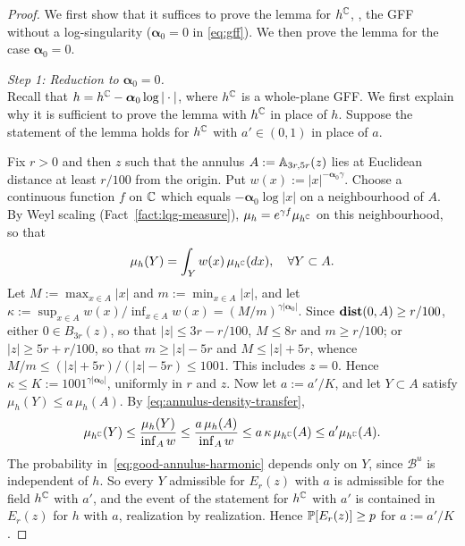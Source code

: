 \documentclass[12pt]{amsart}
\numberwithin{equation}{section}
\begin{document}
	\begin{proof}
		
		
		We first show that it suffices to prove the lemma for $h^{\C}$, \ie, the GFF without a log-singularity ($\boldsymbol{\alpha}_0 = 0$ in \eqref{eq:gff}).
		We then prove the lemma for the case $\boldsymbol{\alpha}_0 = 0$.
		
		{\it Step 1: Reduction to $\boldsymbol{\alpha}_0 = 0$.} \\
		Recall that $h = h^\C -\boldsymbol{\alpha}_0 \log |\cdot|$, where $h^\C$ is a whole-plane GFF. 
		We first explain why it is sufficient to prove the lemma with $h^\C$ in place of $h$. 
		Suppose the statement of the lemma holds for $h^{\C}$ with $a' \in (0,1)$ in place of $a$. 
		
		Fix $r > 0$ and then $z$ such that the annulus $A := \A_{3 r, 5 r}(z)$ lies at Euclidean distance at least $r/100$ from the origin. Put $w(x) := |x|^{-\boldsymbol{\alpha}_0 \gamma}$.
		Choose a continuous function $f$ on $\C$ which equals $-\boldsymbol{\alpha}_0 \log|x|$ on a neighbourhood of $A$. By Weyl scaling (Fact~\ref{fact:lqg-measure}), $\mu_h = e^{\gamma f} \mu_{h^{\C}}$ on this neighbourhood, so that
		\begin{equation} \label{eq:annulus-density-transfer}
		\mu_h(Y) = \int_Y w(x) \, \mu_{h^{\C}}(dx), \quad \forall Y \subset A .
		\end{equation}
		Let $M := \max_{x \in A} |x|$ and $m := \min_{x \in A} |x|$, and let $\kappa := \sup_{x \in A} w(x) / \inf_{x \in A} w(x) = (M/m)^{\gamma|\boldsymbol{\alpha}_0|}$. Since $\dist(0,A) \geq r/100$, either $0 \in B_{3r}(z)$, so that $|z| \leq 3r - r/100$, $M \leq 8r$ and $m \geq r/100$; or $|z| \geq 5r + r/100$, so that $m \geq |z| - 5r$ and $M \leq |z| + 5r$, whence $M/m \leq (|z|+5r)/(|z|-5r) \leq 1001$. This includes $z = 0$. Hence $\kappa \leq K := 1001^{\gamma|\boldsymbol{\alpha}_0|}$, uniformly in $r$ and $z$.
		Now let $a := a'/K$, and let $Y \subset A$ satisfy $\mu_h(Y) \leq a\, \mu_h(A)$. By \eqref{eq:annulus-density-transfer},
		\[
		\mu_{h^{\C}}(Y) \leq \frac{\mu_h(Y)}{\inf_A w} \leq \frac{a\, \mu_h(A)}{\inf_A w} \leq a\, \kappa\, \mu_{h^{\C}}(A) \leq a' \mu_{h^{\C}}(A).
		\]
		The probability in~\eqref{eq:good-annulus-harmonic} depends only on $Y$, since $\mathcal B^u$ is independent of $h$. So every $Y$ admissible for $E_r(z)$ with $a$ is admissible for the field $h^{\C}$ with $a'$, and the event of the statement for $h^{\C}$ with $a'$ is contained in $E_r(z)$ for $h$ with $a$, realization by realization. Hence $\P[E_r(z)] \geq p$ for $a := a'/K$.
		

\end{proof}
\end{document}
